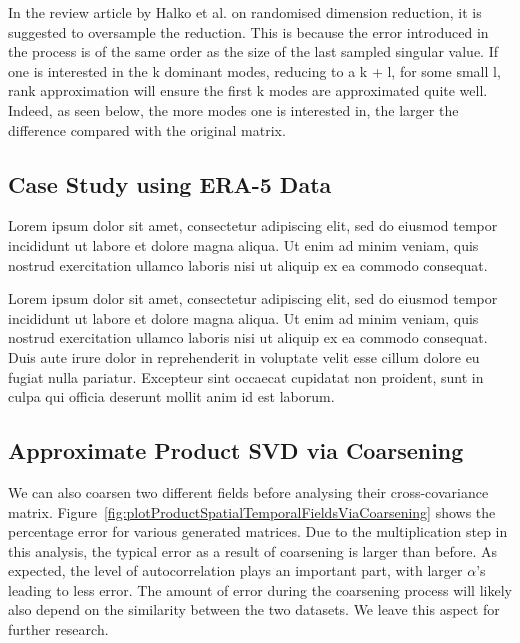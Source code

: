 \documentclass[ijgi,article,submit,moreauthors,pdftex,10pt,a4paper]{Definitions/mdpi}
\begin{document}
In the review article by Halko et al. on randomised dimension reduction, it is suggested to oversample the reduction. This is because the error introduced in the process is of the same order as the size of the last sampled singular value. If one is interested in the k dominant modes, reducing to a k + l, for some small l, rank approximation will ensure the first k modes are approximated quite well. Indeed, as seen below, the more modes one is interested in, the larger the difference compared with the original matrix.%

\subsection{Case Study using ERA-5 Data}
\label{sec:Results/Case Study using ERA-5 Data}

Lorem ipsum dolor sit amet, consectetur adipiscing elit, sed do eiusmod tempor incididunt ut labore et dolore magna aliqua. Ut enim ad minim veniam, quis nostrud exercitation ullamco laboris nisi ut aliquip ex ea commodo consequat.

Lorem ipsum dolor sit amet, consectetur adipiscing elit, sed do eiusmod tempor incididunt ut labore et dolore magna aliqua. Ut enim ad minim veniam, quis nostrud exercitation ullamco laboris nisi ut aliquip ex ea commodo consequat. Duis aute irure dolor in reprehenderit in voluptate velit esse cillum dolore eu fugiat nulla pariatur. Excepteur sint occaecat cupidatat non proident, sunt in culpa qui officia deserunt mollit anim id est laborum.

\subsection{Approximate Product SVD via Coarsening}
\label{sec:Results/Approximate Product SVD via Coarsening}

We can also coarsen two different fields before analysing their cross-covariance matrix. Figure~\ref{fig:plotProductSpatialTemporalFieldsViaCoarsening} shows the percentage error for various generated matrices. Due to the multiplication step in this analysis, the typical error as a result of coarsening is larger than before. As expected, the level of autocorrelation plays an important part, with larger $\alpha$'s leading to less error. The amount of error during the coarsening process will likely also depend on the similarity between the two datasets. We leave this aspect for further research.
\end{document}
